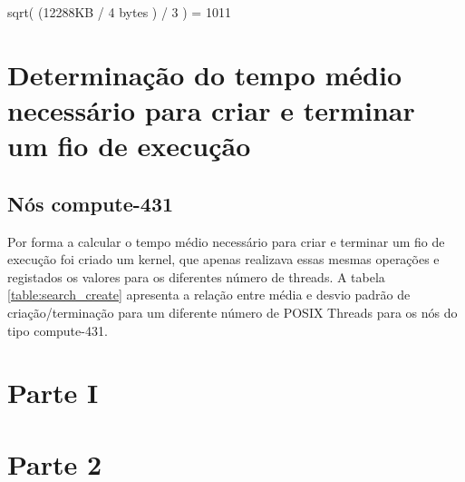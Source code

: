 \documentclass[conference,compsoc]{IEEEtran}
\begin{document}
sqrt( (12288KB / 4 bytes ) / 3 ) = 1011 



  \section{Determinação do tempo médio necessário para criar e  terminar um fio de execução}
  \subsection{Nós compute-431}
  Por forma a calcular o tempo médio necessário para criar e terminar um fio de execução foi criado um kernel, que apenas realizava essas mesmas operações e registados os valores para os diferentes número de threads. A tabela \ref{table:search_create} apresenta a relação entre média e desvio padrão de criação/terminação para um diferente número de POSIX Threads para os nós do tipo compute-431.


\section{Parte I }



\section{Parte 2 }
\end{document}
